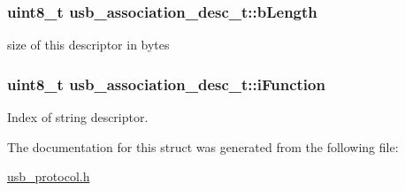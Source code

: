 \hypertarget{structusb__association__desc__t_a774827521c274300369abe56757a12be}{
\subsubsection[{b\-Length}]{\setlength{\rightskip}{0pt plus 5cm}uint8\-\_\-t {\bf usb\-\_\-association\-\_\-desc\-\_\-t\-::b\-Length}}}
\label{structusb__association__desc__t_a774827521c274300369abe56757a12be}


size of this descriptor in bytes 

\hypertarget{structusb__association__desc__t_aeedbc36cd31e652127b78004b0c66031}{
\subsubsection[{i\-Function}]{\setlength{\rightskip}{0pt plus 5cm}uint8\-\_\-t {\bf usb\-\_\-association\-\_\-desc\-\_\-t\-::i\-Function}}}
\label{structusb__association__desc__t_aeedbc36cd31e652127b78004b0c66031}


\-Index of string descriptor. 



\-The documentation for this struct was generated from the following file\-:\begin{DoxyCompactItemize}
\item 
\hyperlink{usb__protocol_8h}{usb\-\_\-protocol.\-h}\end{DoxyCompactItemize}
